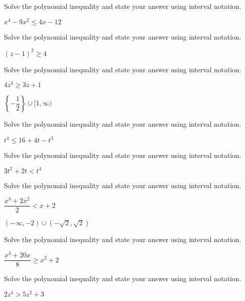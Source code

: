 \documentclass{ximera}
\begin{document}
\begin{problem}
Solve the polynomial inequality and state your answer using interval notation.

$x^{4} - 9x^{2} \leq 4x - 12$
\end{problem}

\begin{problem}
Solve the polynomial inequality and state your answer using interval notation.

$(z - 1)^{2} \geq 4$
\end{problem}

\begin{problem}
Solve the polynomial inequality and state your answer using interval notation.

$4z^3 \geq 3z+1$

\begin{solution}
$\left\{ -\dfrac{1}{2} \right\} \cup [1, \infty)$
\end{solution} 
\end{problem}

\begin{problem}
Solve the polynomial inequality and state your answer using interval notation.

$t^4 \leq 16+4t-t^3$
\end{problem}

\begin{problem}
Solve the polynomial inequality and state your answer using interval notation.

$3t^2 + 2t < t^4$
\end{problem}

\begin{problem}
Solve the polynomial inequality and state your answer using interval notation.

$\dfrac{x^3+2 x^2}{2} < x+2$

\begin{solution}
$(-\infty, -2) \cup \left(-\sqrt{2}, \sqrt{2} \right)$
\end{solution}
\end{problem}

\begin{problem}
Solve the polynomial inequality and state your answer using interval notation.

$\dfrac{x^3+20x}{8} \geq x^2 + 2$
\end{problem}

\begin{problem}
Solve the polynomial inequality and state your answer using interval notation.

$2z^4>5z^2+3$
\end{problem}
\end{document}
